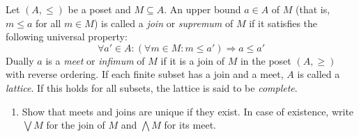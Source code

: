\documentclass{exercises}
\begin{document}
\begin{exercise}
  Let $(A,≤)$ be a poset and $M⊆A$.
  An upper bound $a ∈ A$ of $M$ (that is, $m ≤ a$ for all $m ∈ M$) is called a \emph{join} or \emph{supremum} of $M$ if it satisfies the following universal property:
  $$
  ∀a' ∈ A: (∀m ∈ M:m ≤ a') ⇒ a ≤ a'
  $$
  Dually $a$ is a \emph{meet} or \emph{infimum} of $M$ if it is a join of $M$ in the poset $(A,≥)$ with reverse ordering.
  If each finite subset has a join and a meet, $A$ is called a \emph{lattice}.
  If this holds for all subsets, the lattice is said to be \emph{complete}.

  \begin{enumerate}
    \item Show that meets and joins are unique if they exist.  In case of existence, write $⋁ M$ for the join of $M$ and $⋀ M$ for its meet.


\end{enumerate}
\end{exercise}
\end{document}
